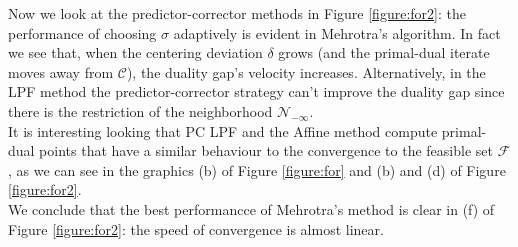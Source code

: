 \documentclass[a4paper,10 pt,titlepage,twoside]{report}
\theoremstyle{plain}
\theoremstyle{definition}
\theoremstyle{remark}
\begin{document}
{{Now we look at the predictor-corrector methods in Figure \ref{figure:for2}: the performance of choosing $\sigma$ adaptively is evident in Mehrotra's algorithm.
In fact we see that, when the centering deviation $\delta$ grows (and the primal-dual iterate moves away from $\mathcal{C}$), the duality gap's velocity increases. Alternatively, in the LPF method the predictor-corrector strategy can't improve the duality gap since there is the restriction of the neighborhood $\mathcal{N}_{-\infty}$.\\
It is interesting looking that PC LPF and the Affine method compute primal-dual points that have a similar behaviour to the convergence to the feasible set $\mathcal{F}$, as we can see in the graphics (b) of Figure \ref{figure:for} and (b) and (d) of Figure \ref{figure:for2}.\\
We conclude that the best performancce of Mehrotra's method is clear in (f) of Figure \ref{figure:for2}: the speed of convergence is almost linear.
\newpage
}}
\end{document}

